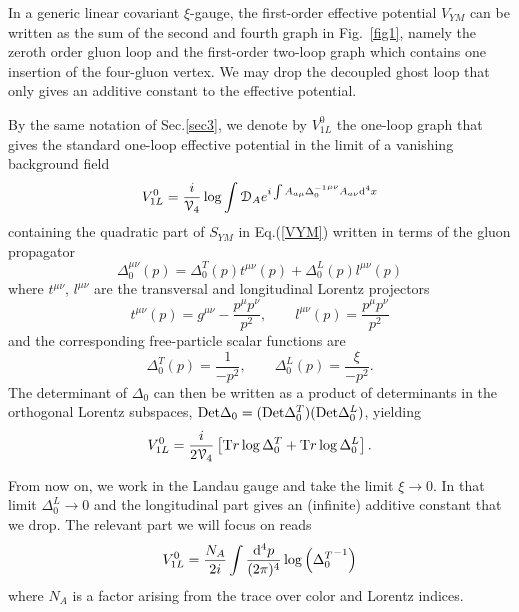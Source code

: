 \documentclass[aps,preprint]{revtex4}
\newcommand{\BE}{\begin{equation}}
\newcommand{\EE}{\end{equation}}
\newcommand{\Tr}{\mathrm Tr}
\newcommand{\ppp}{ \frac{{\rm d}^4p}{(2\pi)^4}}
\begin{document}
In a generic linear covariant $\xi$-gauge, the first-order effective potential $V_{YM}$ can be written as the sum
of the second and fourth graph in Fig.~\ref{fig1}, namely the zeroth order gluon loop and the first-order two-loop graph
which contains one insertion of the four-gluon vertex. We may drop the decoupled ghost loop that only gives an
additive constant to the effective potential.

By the same notation of Sec.\ref{sec3}, we denote by $V^0_{1L}$ the one-loop graph that gives the standard
one-loop effective potential in the limit of a vanishing background field
\BE
V^0_{1L}=\frac{i}{{\cal V}_4} \log \int {\cal D}_{ A} e^{i \int A_{a\mu} {\Delta^{-1}_0}^{\mu\nu}
A_{a\nu} {\rm d}^4x}
\EE
containing the quadratic part of $S_{YM}$ in Eq.(\ref{VYM}) written in terms of the gluon propagator
\BE
\Delta^{\mu\nu}_0 (p)=\Delta^T_0(p) t^{\mu\nu}(p)+\Delta^L_0 (p) l^{\mu\nu}(p)
\label{Delta}
\EE
where $t^{\mu\nu}$, $l^{\mu\nu}$ are the transversal and longitudinal Lorentz projectors
\BE
t^{\mu\nu}(p)=g^{\mu\nu}-\frac{p^\mu p^\nu}{p^2}, \qquad
l^{\mu\nu}(p)=\frac{p^\mu p^\nu}{p^2}
\label{proj}
\EE
and the corresponding free-particle scalar functions are
\BE
\Delta_0^T(p)=\frac{1}{-p^2},\qquad \Delta_0^L(p)=\frac{\xi}{-p^2}.
\EE
The determinant of $\Delta_0$ can then be written as a product of determinants in the
orthogonal Lorentz subspaces, ${\rm Det} \Delta_0=({\rm Det}\Delta_0^T) ({\rm Det}\Delta_0^L)$,
yielding
\BE
V^0_{1L}=\frac{i}{2{\cal V}_4}\left[\Tr \log \Delta_0^T+\Tr \log \Delta_0^L\right].
\EE

From now on, we work in the Landau gauge and take the limit $\xi\to 0$. In that limit
$\Delta^L_0\to 0$ and the longitudinal part gives an (infinite) additive constant that we drop.
The relevant part we will focus on reads
\BE
V^0_{1L}=\frac{N_A}{2 i}\int\ppp\log \left({\Delta_0^T}^{-1}\right)
\label{V01L}
\EE
where $N_A$ is a factor arising from the trace over color and Lorentz indices.
\end{document}
